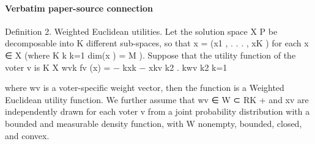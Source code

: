 \documentclass[10pt]{article}
\begin{document}
\paragraph{Verbatim paper-source connection}
\begin{ReviewVerbatim}
Definition 2. Weighted Euclidean utilities. Let the solution space X P           be decomposable
into K different sub-spaces, so that x = (x1 , . . . , xK ) for each x ∈ X (where K         k
                                                                                  k=1 dim(x ) =
M ). Suppose that the utility function of the voter v is
                                         K
                                         X  wvk
                              fv (x) = −          kxk − xkv k2 .
                                           kwv k2
                                         k=1

where wv is a voter-specific weight vector, then the function is a Weighted Euclidean utility
function. We further assume that wv ∈ W ⊂ RK      + and xv are independently drawn for each
voter v from a joint probability distribution with a bounded and measurable density function,
with W nonempty, bounded, closed, and convex.
\end{ReviewVerbatim}
\end{document}
